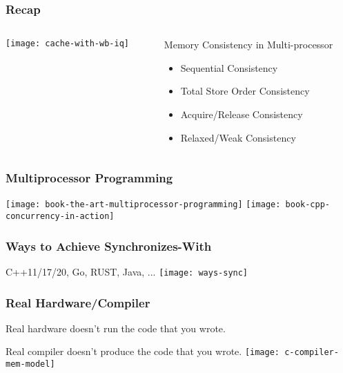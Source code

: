 

\begin{frame}[plain]	
    \frametitle{Recap}
    
    
    \begin{columns}
        
        \begin{column}{.4\textwidth}
            \texttt{[image: cache-with-wb-iq]}
        \end{column}
        \begin{column}{.6\textwidth}
			
\Large
 Memory Consistency in Multi-processor
\begin{itemize}
    \item Sequential Consistency
    \item  Total Store Order Consistency
    \item Acquire/Release Consistency
    
    \item Relaxed/Weak Consistency
    
    
\end{itemize}
        \end{column}
    \end{columns}
    
\end{frame}

\begin{frame}
    \frametitle{Multiprocessor Programming}

    \texttt{[image: book-the-art-multiprocessor-programming]}
    \texttt{[image: book-cpp-concurrency-in-action]}
\end{frame}


\begin{frame}
    \frametitle{Ways to Achieve Synchronizes-With}
    C++11/17/20, Go, RUST, Java, ...
    \texttt{[image: ways-sync]}
\end{frame}

\begin{frame}
  \frametitle{Real Hardware/Compiler}
    Real hardware doesn’t run the code that you wrote.
    
    Real compiler doesn’t produce the code that you wrote.
    \texttt{[image: c-compiler-mem-model]}
\end{frame}


